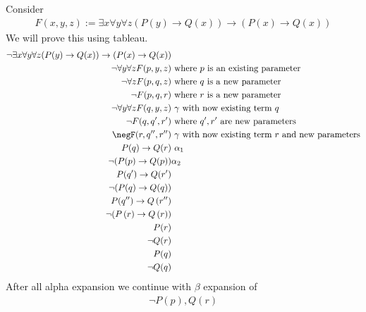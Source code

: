 \documentclass[a4paper]{article}
\theoremstyle{plain}
\theoremstyle{definition}
\newtheorem{exmp}{Example}[section]
\theoremstyle{remark}
\begin{document}
\begin{tcolorbox}[colback=black!3!white,colframe=black!60!white,title=\begin{exmp}Example with multiple gamma and delta \label{Example with multiple gamma and delta}\end{exmp}]
        Consider
                \begin{align}
                F(x,y,z) := \exists x \forall y \forall z (P(y) \to Q(x)) \to ( P(x) \to Q(x))
                \end{align}
		We will prove this using tableau.
		\begin{align}
			\neg \exists x \forall y \forall z (P(y) \to Q(x)) \to ( P(x) \to Q(x)) & \\
			\neg \forall y \forall z F(p,y,z) & \text{ where $p$ is an existing parameter} \\
			\neg \forall z F(p,q,z) & \text{ where $q$ is a new parameter}\\ 
			\neg F ( p,q,r) & \text{ where $r$ is a new parameter} \\
			\neg \forall  y \forall z F(q,y,z) & \text{ $\gamma$ with now existing term $q$} \\
			\neg F(q,q',r') & \text{ where $q', r'$ are new parameters} \\
			\negF(r,q'',r'') & \text{ $\gamma$ with now existing term $r$ and new parameters} \\
			P(q) \to  Q(r) & \text{ $\alpha_1$} \\
			\neg (P(p) \to Q(p)) & \alpha_2 \\
			P(q') \to  Q(r') \\
			\neg (P(q) \to Q(q)) \\
			P(q'') \to Q\left( r'' \right) \\
			\neg (P\left( r \right) \to Q\left( r \right) )\\
			P(r) \\
			\neg Q(r) \\
			P(q) \\
			\neg Q(q)
		\end{align}
		After all alpha expansion we continue with $\beta$ expansion of
		\begin{align}
		\neg P(p), Q(r)	
		\end{align}
\end{tcolorbox}
\end{document}
